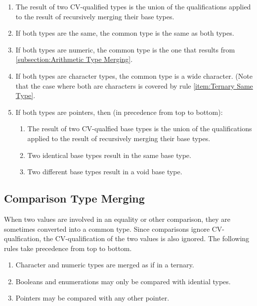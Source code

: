 \documentclass[letterpaper,12pt]{book}
\begin{document}
\begin{enumerate}
	\item The result of two CV-qualified types is the union of the qualifications applied to the result of recursively merging their base types.\label{item:Ternary Same Type}
	
	\item If both types are the same, the common type is the same as both types.
	
	\item If both types are numeric, the common type is the one that results from \ref{subsection:Arithmetic Type Merging}.
	
	\item If both types are character types, the common type is a wide character. (Note that the case where both are characters is covered by rule \ref{item:Ternary Same Type}.
	
	\item If both types are pointers, then (in precedence from top to bottom):
	\begin{enumerate}
		\item The result of two CV-qualfied base types is the union of the qualifications applied to the result of recursively merging their base types.
		
		\item Two identical base types result in the same base type.
		
		\item Two different base types result in a void base type.
	\end{enumerate}
\end{enumerate}

\subsection{Comparison Type Merging}\label{subsection:Comparison Type Merging}

When two values are involved in an equality or other comparison, they are sometimes converted into a common type. Since comparisons ignore CV-qualfication, the CV-qualification of the two values is also ignored. The following rules take precedence from top to bottom.

\begin{enumerate}
	\item Character and numeric types are merged as if in a ternary.
	
	\item Booleans and enumerations may only be compared with idential types.
	
	\item Pointers may be compared with any other pointer.
\end{enumerate}
\end{document}
